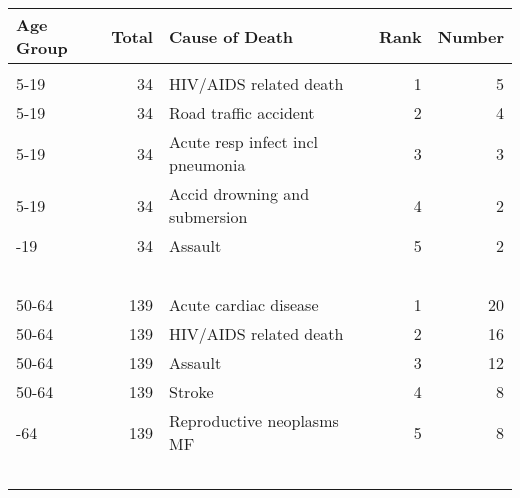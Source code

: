 \documentclass[
]{article}
\begin{document}
\begin{table}[H]
\centering
\begin{tabular}{lrlrr}
\toprule
Age Group & Total & Cause of Death & Rank & Number\\
\midrule
\cellcolor{gray!6}{<1} & \cellcolor{gray!6}{4} & \cellcolor{gray!6}{Acute resp infect incl pneumonia} & \cellcolor{gray!6}{1} & \cellcolor{gray!6}{1}\\
5-19 & 34 & HIV/AIDS related death & 1 & 5\\
5-19 & 34 & Road traffic accident & 2 & 4\\
5-19 & 34 & Acute resp infect incl pneumonia & 3 & 3\\
5-19 & 34 & Accid drowning and submersion & 4 & 2\\
\addlinespace
5-19 & 34 & Assault & 5 & 2\\
\cellcolor{gray!6}{20-49} & \cellcolor{gray!6}{183} & \cellcolor{gray!6}{HIV/AIDS related death} & \cellcolor{gray!6}{1} & \cellcolor{gray!6}{42}\\
\cellcolor{gray!6}{20-49} & \cellcolor{gray!6}{183} & \cellcolor{gray!6}{Assault} & \cellcolor{gray!6}{2} & \cellcolor{gray!6}{29}\\
\cellcolor{gray!6}{20-49} & \cellcolor{gray!6}{183} & \cellcolor{gray!6}{Road traffic accident} & \cellcolor{gray!6}{3} & \cellcolor{gray!6}{17}\\
\cellcolor{gray!6}{20-49} & \cellcolor{gray!6}{183} & \cellcolor{gray!6}{Acute cardiac disease} & \cellcolor{gray!6}{4} & \cellcolor{gray!6}{11}\\
\addlinespace
\cellcolor{gray!6}{20-49} & \cellcolor{gray!6}{183} & \cellcolor{gray!6}{} & \cellcolor{gray!6}{5} & \cellcolor{gray!6}{8}\\
50-64 & 139 & Acute cardiac disease & 1 & 20\\
50-64 & 139 & HIV/AIDS related death & 2 & 16\\
50-64 & 139 & Assault & 3 & 12\\
50-64 & 139 & Stroke & 4 & 8\\
\addlinespace
50-64 & 139 & Reproductive neoplasms MF & 5 & 8\\
\cellcolor{gray!6}{65+} & \cellcolor{gray!6}{280} & \cellcolor{gray!6}{Acute cardiac disease} & \cellcolor{gray!6}{1} & \cellcolor{gray!6}{76}\\
\cellcolor{gray!6}{65+} & \cellcolor{gray!6}{280} & \cellcolor{gray!6}{Other and unspecified cardiac dis} & \cellcolor{gray!6}{2} & \cellcolor{gray!6}{36}\\
\cellcolor{gray!6}{65+} & \cellcolor{gray!6}{280} & \cellcolor{gray!6}{Stroke} & \cellcolor{gray!6}{3} & \cellcolor{gray!6}{36}\\
\cellcolor{gray!6}{65+} & \cellcolor{gray!6}{280} & \cellcolor{gray!6}{Acute resp infect incl pneumonia} & \cellcolor{gray!6}{4} & \cellcolor{gray!6}{15}\\
\addlinespace
\cellcolor{gray!6}{65+} & \cellcolor{gray!6}{280} & \cellcolor{gray!6}{Reproductive neoplasms MF} & \cellcolor{gray!6}{5} & \cellcolor{gray!6}{14}\\
\bottomrule
\end{tabular}
\end{table}
\end{document}
